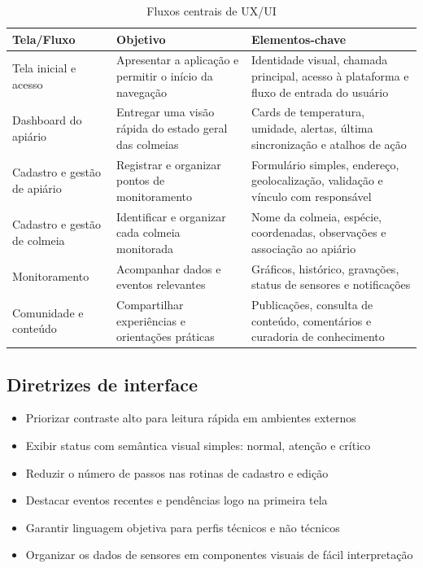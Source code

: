 \documentclass[11pt,a4paper]{article}
\begin{document}
\begin{table}[H]
\centering
\caption{Fluxos centrais de UX/UI}
\label{tab:ux-flows}
\begin{tabular}{|p{3.2cm}|p{4.1cm}|p{6.7cm}|}
\hline
\textbf{Tela/Fluxo} & \textbf{Objetivo} & \textbf{Elementos-chave} \\
\hline
Tela inicial e acesso & Apresentar a aplicação e permitir o início da navegação & Identidade visual, chamada principal, acesso à plataforma e fluxo de entrada do usuário \\
\hline
Dashboard do apiário & Entregar uma visão rápida do estado geral das colmeias & Cards de temperatura, umidade, alertas, última sincronização e atalhos de ação \\
\hline
Cadastro e gestão de apiário & Registrar e organizar pontos de monitoramento & Formulário simples, endereço, geolocalização, validação e vínculo com responsável \\
\hline
Cadastro e gestão de colmeia & Identificar e organizar cada colmeia monitorada & Nome da colmeia, espécie, coordenadas, observações e associação ao apiário \\
\hline
Monitoramento & Acompanhar dados e eventos relevantes & Gráficos, histórico, gravações, status de sensores e notificações \\
\hline
Comunidade e conteúdo & Compartilhar experiências e orientações práticas & Publicações, consulta de conteúdo, comentários e curadoria de conhecimento \\
\hline
\end{tabular}
\end{table}

\subsection{Diretrizes de interface}

\begin{itemize}
    \item Priorizar contraste alto para leitura rápida em ambientes externos
    \item Exibir status com semântica visual simples: normal, atenção e crítico
    \item Reduzir o número de passos nas rotinas de cadastro e edição
    \item Destacar eventos recentes e pendências logo na primeira tela
    \item Garantir linguagem objetiva para perfis técnicos e não técnicos
    \item Organizar os dados de sensores em componentes visuais de fácil interpretação
\end{itemize}
\end{document}
